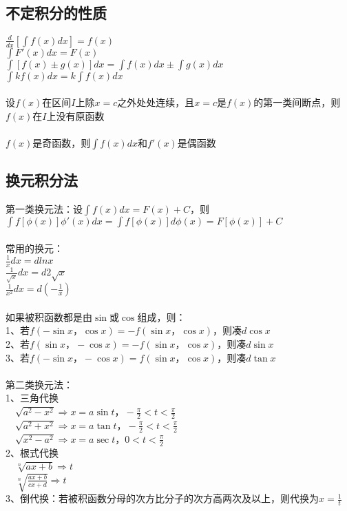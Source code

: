 \documentclass{article}
\begin{document}
\begin{flushleft}
	\subsection{不定积分的性质}
	
	$\frac{d}{dx}[\int f(x)dx]=f(x)$\\
	$\int F'(x)dx=F(x)$\\
	$\int [f(x)\pm g(x)]dx=\int f(x)dx \pm \int g(x)dx$\\
	$\int kf(x)dx=k\int f(x)dx$\\
	~\\
	设$f(x)$在区间$I$上除$x=c$之外处处连续，且$x=c$是$f(x)$的第一类间断点，则$f(x)$在$I$上没有原函数\\
	~\\
	$f(x)$是奇函数，则$\int f(x)dx$和$f'(x)$是偶函数\\
	
	\subsection{换元积分法}
	
	第一类换元法：设$\int f(x)dx=F(x)+C$，则$\int f[\phi(x)]\phi'(x)dx=\int f[\phi(x)]d\phi(x)=F[\phi(x)]+C$\\
	~\\
	常用的换元：\\
	$\frac{1}{x}dx=dlnx$\\
	$\frac{1}{\sqrt{x}}dx=d2\sqrt{x}$\\
	$\frac{1}{x^2}dx=d(-\frac{1}{x})$\\
	~\\
	如果被积函数都是由$\sin$或$\cos$组成，则：\\
	1、若$f(-\sin x，\cos x)=-f(\sin x，\cos x)$，则凑$d\cos x$\\
	2、若$f(\sin x，-\cos x)=-f(\sin x，\cos x)$，则凑$d\sin x$\\
	3、若$f(-\sin x，-\cos x)=f(\sin x，\cos x)$，则凑$d\tan x$\\
	~\\
	第二类换元法：\\
	1、三角代换\\
	\ \ $\sqrt{a^2-x^2} \Rightarrow x=a\sin t， -\frac{\pi}{2}<t<\frac{\pi}{2}$\\
	\ \ $\sqrt{a^2+x^2} \Rightarrow x=a\tan t， -\frac{\pi}{2}<t<\frac{\pi}{2}$\\
	\ \ $\sqrt{x^2-a^2} \Rightarrow x=a\sec t， 0<t<\frac{\pi}{2}$\\
	2、根式代换\\
	\ \ $\sqrt[n]{ax+b} \Rightarrow t$\\
	\ \ $\sqrt[n]{\frac{ax+b}{cx+d}} \Rightarrow t$\\
	3、倒代换：若被积函数分母的次方比分子的次方高两次及以上，则代换为$x=\frac{1}{t}$\\
	

\end{flushleft}
\end{document}

